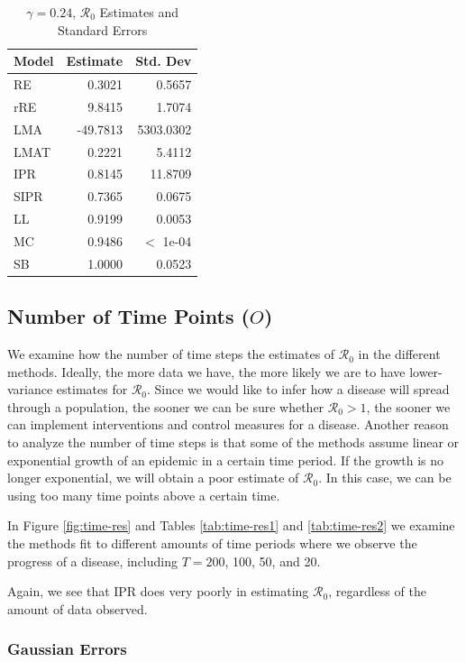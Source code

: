 \documentclass[12pt]{article}
\newcommand{\rr}{\ensuremath{\mathcal{R}_0}}
\begin{document}
\begin{table}[H]
	
	\centering
	\begin{tabular}[t]{l|r|r}
		\hline
		Model & Estimate & Std. Dev\\
		\hline
		RE & 0.3021 & 0.5657\\
		\hline
		rRE & 9.8415 & 1.7074\\
		\hline
		LMA & -49.7813 & 5303.0302\\
		\hline
		LMAT & 0.2221 & 5.4112\\
		\hline
		IPR & 0.8145 & 11.8709\\
		\hline
		SIPR & 0.7365 & 0.0675\\
		\hline
		LL & 0.9199 & 0.0053\\
		\hline
		MC & 0.9486 & $<$ 1e-04\\
		\hline
		SB & 1.0000 & 0.0523\\
		\hline
	\end{tabular}
	\caption{$\gamma = 0.24$, $\rr$ Estimates and Standard Errors}
\end{table}

\subsection{Number of Time Points ($O$)}\label{sec:res-time}
We examine how the number of time steps the estimates of $\rr$ in the different methods.  Ideally, the more data we have, the more likely we are to have lower-variance estimates for $\rr$.  Since we would like to  infer how a disease will spread through a population, the sooner we can be sure whether $\rr> 1$, the sooner we can implement interventions and control measures for a disease.  Another reason to analyze the number of time steps is that some of the methods assume linear or exponential growth of an epidemic in a certain time period.  If the growth is no longer exponential, we will obtain a poor estimate of $\rr$.  In this case, we can be using too many time points above a certain time.

In Figure \ref{fig:time-res} and Tables \ref{tab:time-res1} and \ref{tab:time-res2} we examine the methods fit to different amounts of time periods where we observe the progress of a disease, including $T=200$, 100, 50, and 20.

Again, we see that IPR does very poorly in estimating $\rr$, regardless of the amount of data observed.

\subsubsection{Gaussian Errors}
\end{document}
